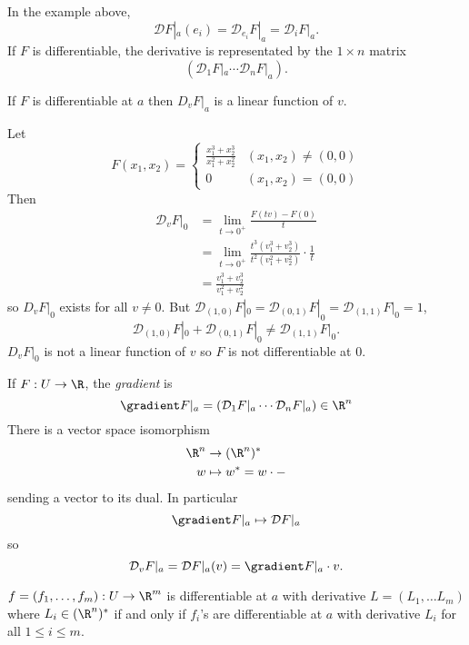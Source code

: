 \documentclass[a4paper]{article}
\newcommand*{\D}{\mathcal{D}}
\theoremstyle{definition}
\begin{document}
\begin{eg}
  In the example above,
  \[
    \D F|_a(e_i) = \D_{e_i} F|_a = \D_i F|_a.
  \]
  If \(F\) is differentiable, the derivative is representated by the \(1 \times n\) matrix
  \[
    (\D_1 F|_a \cdots \D_n F|_a).
  \]
\end{eg}

\begin{corollary}
  If \(F\) is differentiable at \(a\) then \(D_v F|_a\) is a linear function of \(v\).
\end{corollary}

\begin{eg}
  Let
  \[
    F(x_1, x_2) =
    \begin{cases}
      \frac{x_1^3 + x_2^3}{x_1^2 + x_2^2} & (x_1, x_2) \neq (0, 0) \\
      0 & (x_1, x_2) = (0, 0)
    \end{cases}
  \]
  Then
  \begin{align*}
    \D_v F|_0 &= \lim_{t \to 0^+} \frac{F(tv) - F(0)}{t} \\
              &= \lim_{t \to 0^+} \frac{t^3(v_1^3 + v_2^3)}{t^2(v_1^2 + v_2^2)} \cdot \frac{1}{t}\\
              &= \frac{v_1^3 + v_2^3}{v_1^2 + v_2^2}
  \end{align*}
  so \(D_v F|_0\) exists for all \(v \neq 0\). But \(\D_{(1, 0)} F|_0 = \D_{(0, 1)} F|_0 = \D_{(1, 1)} F|_0 = 1\),
  \[
    \D_{(1, 0)} F|_0 + \D_{(0, 1)} F|_0 \neq \D_{(1, 1)} F|_0.
  \]
  \(D_v F|_0\) is not a linear function of \(v\) so \(F\) is not differentiable at \(0\).
\end{eg}

\begin{remark}
  If \(F: U \to \R\), the \emph{gradient} is
  \[
    \gradient F|_a = (\D_1 F|_a \cdots \D_n F|_a) \in \R^n
  \]
  There is a vector space isomorphism
  \begin{align*}
    \R^n &\to (\R^n)^* \\
    w &\mapsto w^* = w \cdot -
  \end{align*}
  sending a vector to its dual. In particular
  \[
    \gradient F|_a \mapsto \D F|_a
  \]
  so
  \[
    \D_v F|_a = \D F|_a(v) = \gradient F|_a \cdot v.
  \]
\end{remark}

\begin{proposition}
  \(f = (f_1, \dots, f_m): U \to \R^m\) is differentiable at \(a\) with derivative \(L = (L_1, \dots L_m)\) where \(L_i \in (\R^n)^*\) if and only if \(f_i\)'s are differentiable at \(a\) with derivative \(L_i\) for all \(1 \leq i \leq m\).
\end{proposition}
\end{document}
